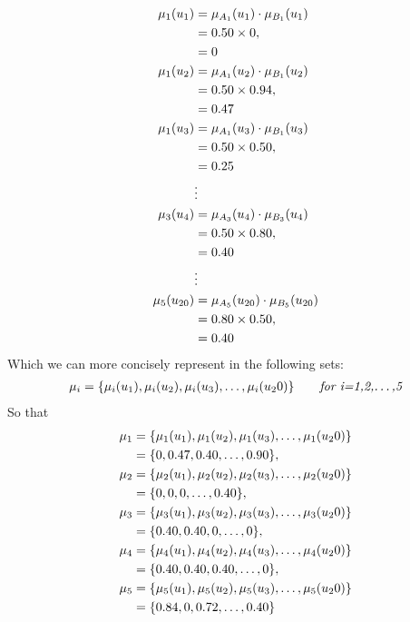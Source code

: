 \documentclass[a4paper,openany]{book}
\begin{document}
				\begin{align}
					\mu_1(u_1) &= \mu_{A_1}(u_1) \cdot \mu_{B_1}(u_1) \\
					&= 0.50 \times 0 \notag ,\\
					&= 0 \notag\\
					\mu_1(u_2) &= \mu_{A_1}(u_2) \cdot \mu_{B_1}(u_2) \\
					&= 0.50 \times 0.94 \notag ,\\
					&= 0.47 \notag\\
					\mu_1(u_3) &= \mu_{A_1}(u_3) \cdot \mu_{B_1}(u_3) \\
					&= 0.50 \times 0.50 \notag ,\\
					&= 0.25 \notag\\
					&\vdots \notag \\
					\mu_3(u_4) &= \mu_{A_3}(u_4) \cdot \mu_{B_3}(u_4) \\
					&= 0.50 \times 0.80 \notag ,\\
					&= 0.40 \notag\\
					&\vdots \notag \\
					\mu_5(u_{20}) &= \mu_{A_5}(u_{20}) \cdot \mu_{B_5}(u_{20}) \\
					&= 0.80 \times 0.50 \notag ,\\
					&= 0.40 \notag\\
				\end{align}
				Which we can more concisely represent in the following sets:
				\begin{align}
					\mu_i = \{ \mu_i(u_1), \mu_i(u_2), \mu_i(u_3),\dots,\mu_i(u_20) \} \qquad \textit{for i=1,2,\dots,5}
				\end{align}
				So that
				\begin{align}
					\mu_1 &= \{ \mu_1(u_1), \mu_1(u_2), \mu_1(u_3),\dots,\mu_1(u_20) \} \\
					&= \{ 0, 0.47, 0.40,\dots,0.90 \} \notag ,\\
					\mu_2 &= \{ \mu_2(u_1), \mu_2(u_2), \mu_2(u_3),\dots,\mu_2(u_20) \}\\
					&= \{ 0, 0, 0,\dots,0.40 \} \notag ,\\
					\mu_3 &= \{ \mu_3(u_1), \mu_3(u_2), \mu_3(u_3),\dots,\mu_3(u_20) \}\\
					&= \{ 0.40, 0.40, 0,\dots,0 \} \notag ,\\
					\mu_4 &= \{ \mu_4(u_1), \mu_4(u_2), \mu_4(u_3),\dots,\mu_4(u_20) \}\\
					&= \{ 0.40, 0.40, 0.40,\dots,0 \} \notag ,\\
					\mu_5 &= \{ \mu_5(u_1), \mu_5(u_2), \mu_5(u_3),\dots,\mu_5(u_20) \}\\
					&= \{ 0.84, 0, 0.72,\dots,0.40 \} \notag					
				\end{align}
				
\end{document}
